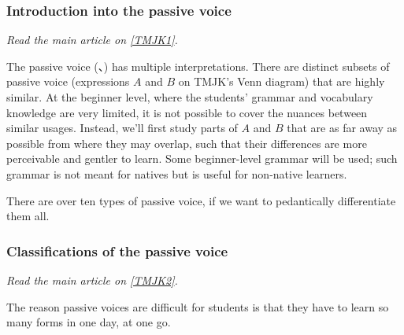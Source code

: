 \documentclass[../nihongo-gakushuu-kyouzai.tex]{subfiles}
\begin{document}
\subsubsection{Introduction into the passive voice } \label{sec:tmjk-1-introduction-to-passive-voice}
\emph{Read the main article on \href{https://www.tomojuku.com/blog/passive/}{[TMJK1]}.}

The passive voice (、) has multiple interpretations. There are distinct subsets of passive voice (expressions $A$ and $B$ on TMJK's Venn diagram) that are highly similar. At the beginner level, where the students' grammar and vocabulary knowledge are very limited, it is not possible to cover the nuances between similar usages. Instead, we'll first study parts of $A$ and $B$ that are as far away as possible from where they may overlap, such that their differences are more perceivable and gentler to learn. Some beginner-level grammar will be used; such grammar is not meant for natives but is useful for non-native learners.

There are over ten types of passive voice, if we want to pedantically differentiate them all.


\subsubsection{Classifications of the passive voice} \label{sec:tmjk-2-classifications-of-passive-voice}
\emph{Read the main article on \href{https://www.tomojuku.com/blog/passive/passive-2/}{[TMJK2]}.}

The reason passive voices are difficult for students is that they have to learn so many forms in one day, at one go.
\end{document}
